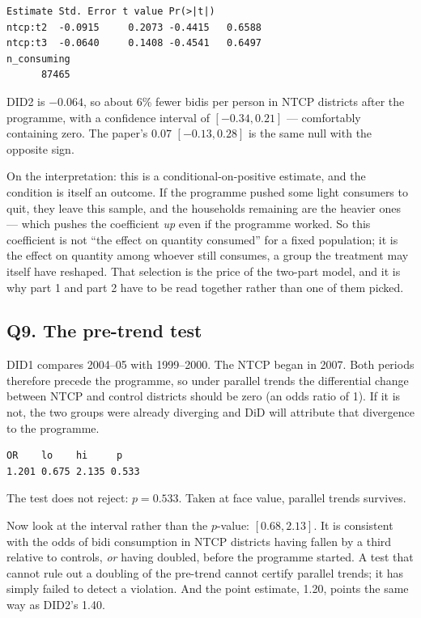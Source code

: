 \documentclass[11pt,a4paper]{article}
\newcommand{\qhead}[1]{\subsection*{#1}\addcontentsline{toc}{subsection}{#1}}
\begin{document}
\begin{lstlisting}[style=rout]
        Estimate Std. Error t value Pr(>|t|)
ntcp:t2  -0.0915     0.2073 -0.4415   0.6588
ntcp:t3  -0.0640     0.1408 -0.4541   0.6497
n_consuming
      87465
\end{lstlisting}

DID2 is $-0.064$, so about 6\% fewer bidis per person in NTCP districts after
the programme, with a confidence interval of $[-0.34, 0.21]$ --- comfortably
containing zero. The paper's $0.07$ $[-0.13, 0.28]$ is the same null with the
opposite sign.

On the interpretation: this is a conditional-on-positive estimate, and the
condition is itself an outcome. If the programme pushed some light consumers
to quit, they leave this sample, and the households remaining are the heavier
ones --- which pushes the coefficient \emph{up} even if the programme worked.
So this coefficient is not ``the effect on quantity consumed'' for a fixed
population; it is the effect on quantity among whoever still consumes, a group
the treatment may itself have reshaped. That selection is the price of the
two-part model, and it is why part 1 and part 2 have to be read together
rather than one of them picked.

\qhead{Q9. The pre-trend test}

DID1 compares 2004--05 with 1999--2000. The NTCP began in 2007. Both periods
therefore precede the programme, so under parallel trends the differential
change between NTCP and control districts should be zero (an odds ratio of 1).
If it is not, the two groups were already diverging and DiD will attribute that
divergence to the programme.

\begin{lstlisting}[style=rout]
   OR    lo    hi     p
1.201 0.675 2.135 0.533
\end{lstlisting}

The test does not reject: $p = 0.533$. Taken at face value, parallel trends
survives.

Now look at the interval rather than the $p$-value: $[0.68, 2.13]$. It is
consistent with the odds of bidi consumption in NTCP districts having fallen
by a third relative to controls, \emph{or} having doubled, before the
programme started. A test that cannot rule out a doubling of the pre-trend
cannot certify parallel trends; it has simply failed to detect a violation.
And the point estimate, 1.20, points the same way as DID2's 1.40.
\end{document}
